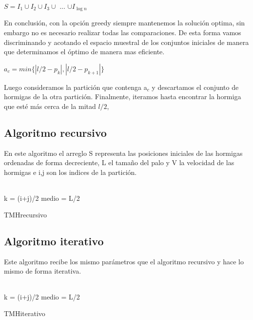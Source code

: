 \documentclass[11pt,spanish]{article}
\begin{document}
\begin{center}$S = I_1 \cup I_2 \cup I_3 \cup$ ... $\cup I_{\log{n}}$\end{center}
En conclusión, con la opción greedy siempre mantenemos la solución optima, sin embargo no es necesario realizar todas las comparaciones. De esta forma vamos discriminando y acotando el espacio muestral de los conjuntos iniciales de manera que determinamos el óptimo de manera mas eficiente.

\begin{center} $a_{c} = min\{|l/2-p_k|,|l/2-p_{k+1}|\}$\end{center}
Luego consideramos la partición que contenga a$_{c}$ y descartamos el conjunto de hormigas de la otra partición. Finalmente, iteramos hasta encontrar la hormiga que esté más cerca de la mitad $l/2$,

\subsection{Algoritmo recursivo}
En este algoritmo el arreglo S representa las posiciones iniciales de las hormigas ordenadas de forma decreciente, L el tamaño del palo y V la velocidad de las hormigas e i,j son los indices de la partición.\\\\
\begin{algorithm}[H]
 k = (i+j)/2\;
 medio = L/2\;
 \caption{TMHrecursivo}
 \label{fig:algo1}
\end{algorithm}
\subsection{Algoritmo iterativo}
Este algoritmo recibe los mismo parámetros que el algoritmo recursivo y hace lo mismo de forma iterativa.\\\\
\begin{algorithm}[H]
 k = (i+j)/2\;
 medio = L/2\;
 \caption{TMHiterativo}
 \label{fig:algo2}
\end{algorithm}
\newpage
\end{document}
